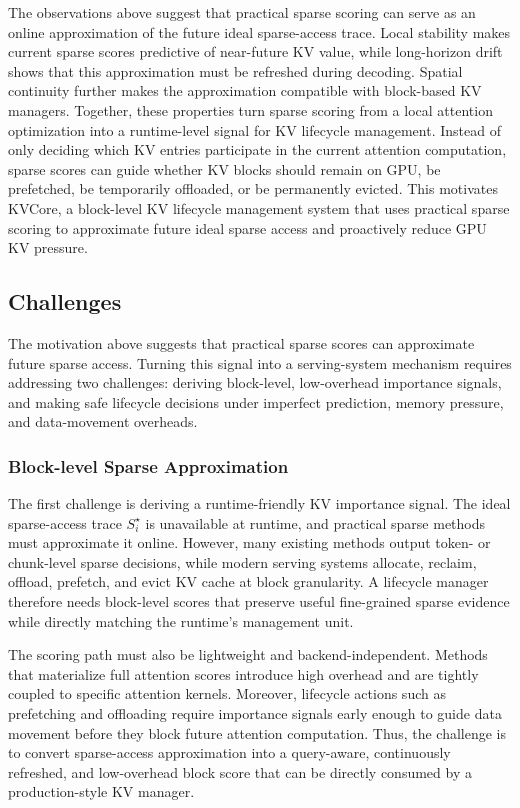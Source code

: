 \documentclass[sigplan,10pt,review,anonymous]{acmart}
\begin{document}
The observations above suggest that practical sparse scoring can serve as an online approximation of the future ideal sparse-access trace.
Local stability makes current sparse scores predictive of near-future KV value, while long-horizon drift shows that this approximation must be refreshed during decoding.
Spatial continuity further makes the approximation compatible with block-based KV managers.
Together, these properties turn sparse scoring from a local attention optimization into a runtime-level signal for KV lifecycle management.
Instead of only deciding which KV entries participate in the current attention computation, sparse scores can guide whether KV blocks should remain on GPU, be prefetched, be temporarily offloaded, or be permanently evicted.
This motivates KVCore, a block-level KV lifecycle management system that uses practical sparse scoring to approximate future ideal sparse access and proactively reduce GPU KV pressure.


\subsection{Challenges}

The motivation above suggests that practical sparse scores can approximate future sparse access.
Turning this signal into a serving-system mechanism requires addressing two challenges:
deriving block-level, low-overhead importance signals, and making safe lifecycle decisions under imperfect prediction, memory pressure, and data-movement overheads.

\subsubsection{Block-level Sparse Approximation}

The first challenge is deriving a runtime-friendly KV importance signal.
The ideal sparse-access trace ${S_i^\star}$ is unavailable at runtime, and practical sparse methods must approximate it online.
However, many existing methods output token- or chunk-level sparse decisions, while modern serving systems allocate, reclaim, offload, prefetch, and evict KV cache at block granularity.
A lifecycle manager therefore needs block-level scores that preserve useful fine-grained sparse evidence while directly matching the runtime's management unit.

The scoring path must also be lightweight and backend-independent.
Methods that materialize full attention scores introduce high overhead and are tightly coupled to specific attention kernels.
Moreover, lifecycle actions such as prefetching and offloading require importance signals early enough to guide data movement before they block future attention computation.
Thus, the challenge is to convert sparse-access approximation into a query-aware, continuously refreshed, and low-overhead block score that can be directly consumed by a production-style KV manager.
\end{document}
